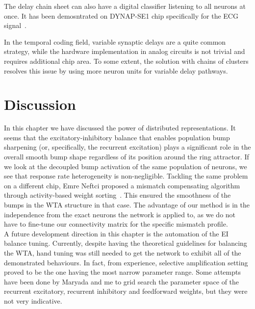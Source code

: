The delay chain sheet can also have a digital classifier listening to all neurons at once. It has been demosntrated on DYNAP-SE1 chip specifically for the ECG signal~\cite{Gerber_etal22}.

In the temporal coding field, variable synaptic delays are a quite common strategy, while the hardware implementation in analog circuits is not trivial and requires additional chip area. To some extent, the solution with chains of clusters resolves this issue by using more neuron units for variable delay pathways.


\section{Discussion}

In this chapter we have discussed the power of distributed representations. It seems that the excitatory-inhibitory balance that enables population bump sharpening (or, specifically, the recurrent excitation) plays a significant role in the overall smooth bump shape regardless of its position around the ring attractor. If we look at the decoupled bump activation of the same population of neurons, we see that response rate heterogeneity is non-negligible.
Tackling the same problem on a different chip, Emre Neftci proposed a mismatch compensating algorithm through activity-based weight sorting~\cite{Neftci_Indiveri10}. This ensured the smoothness of the bumps in the WTA structure in that case. The advantage of our method is in the independence from the exact neurons the network is applied to, as we do not have to fine-tune our connectivity matrix for the specific mismatch profile.\\

A future development direction in this chapter is the automation of the EI balance tuning. Currently, despite having the theoretical guidelines for balancing the WTA, hand tuning was still needed to get the network to exhibit all of the demonstrated behaviours. In fact, from experience, selective amplification setting proved to be the one having the most narrow parameter range. Some attempts have been done by Maryada and me to grid search the parameter space of the recurrent excitatory, recurrent inhibitory and feedforward weights, but they were not very indicative.\\

